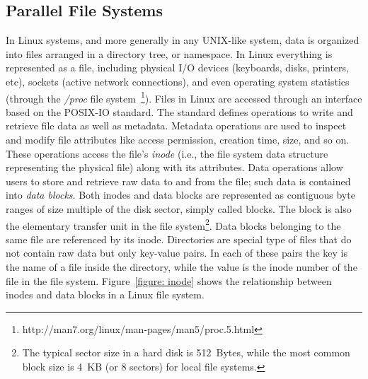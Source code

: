 \subsection{Parallel File Systems}
In Linux systems, and more generally in any UNIX-like system, data is organized into files arranged in a directory tree, or namespace. In Linux everything is represented as a file, including physical I/O 
devices (keyboards, disks, printers, etc), sockets (active network connections), and even operating system statistics (through the \textit{/proc} file system~\footnote{http://man7.org/linux/man-pages/man5/proc.5.html}). 
Files in Linux are accessed through an interface based on the POSIX-IO standard. The standard defines operations to write and retrieve file data as well as metadata. Metadata operations are used to inspect and modify 
file attributes like access permission, creation time, size, and so on. These operations access the file's \textit{inode} (i.e., the file system data structure representing the physical file) along with its attributes. 
Data operations allow users to store and retrieve raw data to and from the file; such data is contained into \textit{data blocks}. Both inodes and data blocks are represented as contiguous byte ranges of size multiple 
of the disk sector, simply called blocks. The block is also the elementary transfer unit in the file system\footnote{The typical sector size in a hard disk is 512~Bytes, while the most common block size is 4~KB (or 8 
sectors) for local file systems.}. Data blocks belonging to the same file are referenced by its inode. Directories are special type of files that do not contain raw data but only key-value pairs. In each of these pairs the key is the name of 
a file inside the directory, while the value is the inode number of the file in the file system. Figure~\ref{figure: inode} shows the relationship between inodes and data blocks in a Linux file system.


